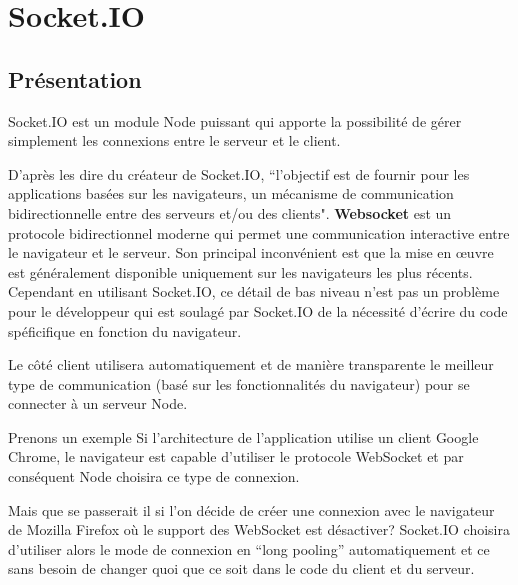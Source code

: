 \section{Socket.IO}
\label{ch:socketio}

\subsection{Présentation}

Socket.IO est un module Node puissant qui apporte la possibilité de gérer simplement les connexions entre le serveur et le client.

D’après les dire du créateur de Socket.IO, “l’objectif est de fournir pour les applications basées sur les navigateurs, un mécanisme de communication bidirectionnelle entre des serveurs et/ou des clients". 
\textbf{Websocket} est un protocole bidirectionnel moderne qui permet une communication interactive  entre le navigateur et le serveur. Son principal inconvénient est que la mise en œuvre est généralement disponible uniquement sur les navigateurs les plus récents.
Cependant en utilisant Socket.IO, ce détail de bas niveau n’est pas un problème pour le développeur qui est soulagé par Socket.IO de la nécessité d’écrire du code spéficifique en fonction du navigateur.

Le côté client utilisera automatiquement et de manière transparente le meilleur type de communication (basé sur les fonctionnalités du navigateur) pour se connecter à un serveur Node.


Prenons un exemple
Si l’architecture de l’application utilise un client Google Chrome, le navigateur est capable d’utiliser le  protocole WebSocket et par conséquent Node choisira ce type de connexion.

Mais que se passerait il si l’on décide de créer une connexion avec le navigateur de Mozilla Firefox où le support des WebSocket est désactiver? Socket.IO choisira d’utiliser alors le mode de connexion en “long pooling”  automatiquement et ce sans besoin de changer quoi que ce soit dans le code du client et du serveur.
